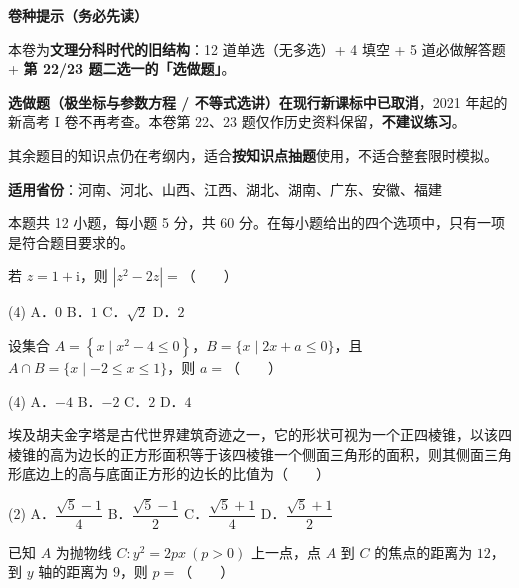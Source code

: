 

\begin{gknotice}
\textbf{ 卷种提示（务必先读）}

本卷为\textbf{文理分科时代的旧结构}：12 道单选（无多选）+ 4 填空 + 5 道必做解答题 + \textbf{第 22/23 题二选一的「选做题」}。

\textbf{选做题（极坐标与参数方程 / 不等式选讲）在现行新课标中已取消}，2021 年起的新高考 I 卷不再考查。本卷第 22、23 题仅作历史资料保留，\textbf{不建议练习}。

其余题目的知识点仍在考纲内，适合\textbf{按知识点抽题}使用，不适合整套限时模拟。

\textbf{适用省份}：河南、河北、山西、江西、湖北、湖南、广东、安徽、福建
\end{gknotice}

\par\medskip


\begin{gktip}
本题共 12 小题，每小题 5 分，共 60 分。在每小题给出的四个选项中，只有一项是符合题目要求的。
\end{gktip}

若 $z=1+\mathrm i$，则 $\left|z^{2}-2z\right|=$（　　）

\begin{gkopts}(4)
\task A．$0$
\task B．$1$
\task C．$\sqrt2$
\task D．$2$
\end{gkopts}

设集合 $A=\left\{x\mid x^{2}-4\le0\right\}$，$B=\{x\mid2x+a\le0\}$，且 $A\cap B=\{x\mid-2\le x\le1\}$，则 $a=$（　　）

\begin{gkopts}(4)
\task A．$-4$
\task B．$-2$
\task C．$2$
\task D．$4$
\end{gkopts}

埃及胡夫金字塔是古代世界建筑奇迹之一，它的形状可视为一个正四棱锥，以该四棱锥的高为边长的正方形面积等于该四棱锥一个侧面三角形的面积，则其侧面三角形底边上的高与底面正方形的边长的比值为（　　）

\begin{gkopts}(2)
\task A．$\dfrac{\sqrt5-1}4$
\task B．$\dfrac{\sqrt5-1}2$
\task C．$\dfrac{\sqrt5+1}4$
\task D．$\dfrac{\sqrt5+1}2$
\end{gkopts}

已知 $A$ 为抛物线 $C:y^{2}=2px\ (p>0)$ 上一点，点 $A$ 到 $C$ 的焦点的距离为 $12$，到 $y$ 轴的距离为 $9$，则 $p=$（　　）

